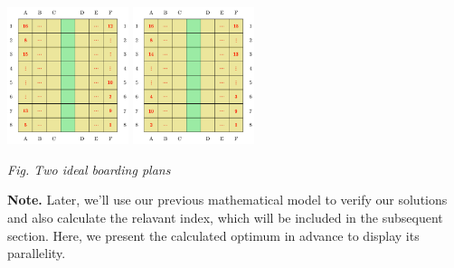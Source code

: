 \documentclass{article}
\begin{document}
	\begin{center}
		\includegraphics[height =4cm]{steffen1.jpg}
		\includegraphics[height = 4cm]{steffen2.jpg}

		\small\textit{Fig. Two ideal boarding plans}
	\end{center}

	\textbf{Note. }Later, we'll use our previous mathematical model to verify our solutions and also calculate the relavant  index, which will be included in the subsequent section. Here, we present the calculated optimum in advance to display its parallelity.
\end{document}
